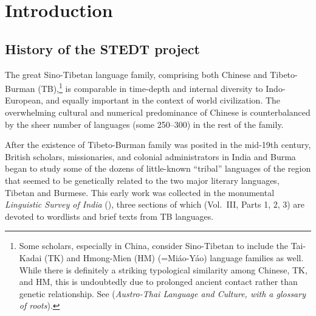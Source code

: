 \vspace{0.25em}


\renewcommand{\thefootnote}{\arabic{footnote}}
\setcounter{footnote}{0}

\chapter*{Introduction}

\nocite{HOD1857,DB-DBF,ACK-GTL,EWC-Ao,JHL-GDL,NS-KED,JNC-SED,CLA1911,WP-TNgd,WS-TCW,GHC-SFPST,JPM-Ao,JHH-Sema,JPM-Reng,PKB-SIL,RB-AFS,GHL-DDAL,RLT-IAD,RAM-Maru,HS-TWPD,PKB-STR,NCB-TFG,EP-CSOC,MVS-GTL,KBK-SOA,LST-Lamet,LI1977,JAM-Rhino,JAM-GDL,WS-TIC,PKB-STAL}

\section{History of the STEDT project}

The great Sino-Tibetan language family, comprising both Chinese and Tibeto-Burman (TB),\footnote{Some scholars, especially in China, consider Sino-Tibetan to include the Tai-Kadai (TK) and Hmong-Mien (HM) (=Mi\'ao-Y\'ao) language families as well.  While there is definitely a striking typological similarity among Chinese, TK, and HM, this is undoubtedly due to prolonged ancient contact rather than genetic relationship.  See \citealt{PKB-ATLC} (\textit{Austro-Thai Language and Culture, with a glossary of roots}).} is comparable in time-depth and internal diversity to Indo-European, and equally important in the context of world civilization. The overwhelming cultural and numerical predominance of Chinese is counterbalanced by the sheer number of languages (some 250–300) in the rest of the family.

After the existence of Tibeto-Burman family was posited in the mid-19th century, British scholars, missionaries, and colonial administrators in India and Burma began to study some of the dozens of little-known “tribal” languages of the region that seemed to be genetically related to the two major literary languages, Tibetan and Burmese. This early work was collected in the monumental \textit{Linguistic Survey of India} (\citealt{LSI}), three sections of which (Vol.~III, Parts 1, 2, 3) are devoted to wordlists and brief texts from TB languages.

